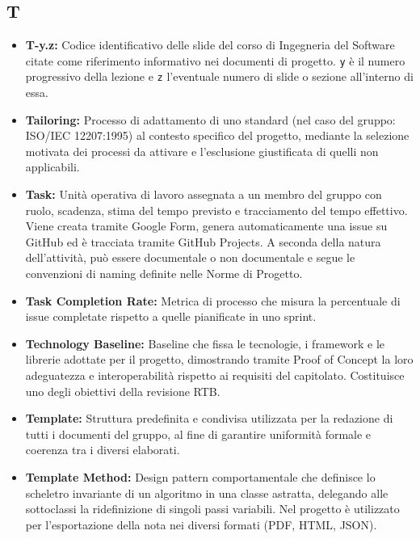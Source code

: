 \subsection*{T}
\begin{itemize}[leftmargin=*]
      \item \textbf{T-y.z:} Codice identificativo delle slide del corso di Ingegneria del Software citate come riferimento informativo nei documenti di progetto. \texttt{y} è il numero progressivo della lezione e \texttt{z} l'eventuale numero di slide o sezione all'interno di essa.
      \item \textbf{Tailoring:} Processo di adattamento di uno standard (nel caso del
            gruppo: ISO/IEC 12207:1995) al contesto specifico del progetto, mediante
            la selezione motivata dei processi da attivare e l'esclusione giustificata
            di quelli non applicabili.
      \item \textbf{Task:} Unità operativa di lavoro assegnata a un membro del gruppo
      con ruolo, scadenza, stima del tempo previsto e tracciamento del tempo effettivo.
      Viene creata tramite Google Form, genera automaticamente una issue su GitHub ed
      è tracciata tramite GitHub Projects. A seconda della natura dell'attività, può
      essere documentale o non documentale e segue le convenzioni di naming definite
      nelle Norme di Progetto.
      \item \textbf{Task Completion Rate:} Metrica di processo che misura la percentuale
      di issue completate rispetto a quelle pianificate in uno sprint.
      \item \textbf{Technology Baseline:} Baseline che fissa le tecnologie, i
            framework e le librerie adottate per il progetto, dimostrando tramite
            Proof of Concept la loro adeguatezza e interoperabilità rispetto ai
            requisiti del capitolato. Costituisce uno degli obiettivi della
            revisione RTB.
      \item \textbf{Template:} Struttura predefinita e condivisa utilizzata per la
            redazione di tutti i documenti del gruppo, al fine di garantire uniformità
            formale e coerenza tra i diversi elaborati.
      \item \textbf{Template Method:} Design pattern comportamentale che definisce lo scheletro invariante di un algoritmo in una classe astratta, delegando alle sottoclassi la ridefinizione di singoli passi variabili. Nel progetto è utilizzato per l'esportazione della nota nei diversi formati (PDF, HTML, JSON).

\end{itemize}
